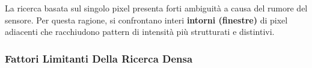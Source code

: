 ﻿\documentclass[11pt, a4paper]{article}
\begin{document}
La ricerca basata sul singolo pixel presenta forti ambiguità a causa del rumore del sensore. Per questa ragione, si confrontano interi \textbf{intorni (finestre)} di pixel adiacenti che racchiudono pattern di intensità più strutturati e distintivi.



\subsubsection{Fattori Limitanti Della Ricerca Densa}
\end{document}
